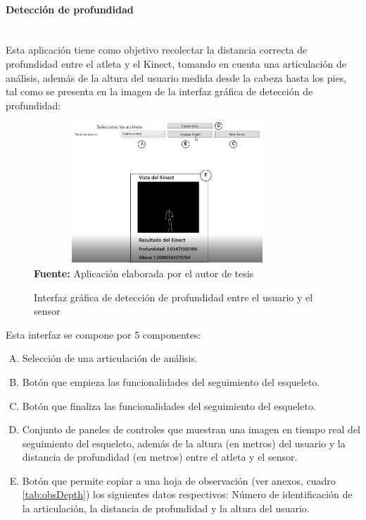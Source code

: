 \paragraph{Detecci\'on de profundidad}\mbox{} \\ \label{ins:UI:wpf:depth}
Esta aplicaci\'on tiene como objetivo recolectar la distancia correcta de profundidad entre el atleta y el Kinect, tomando en cuenta una articulaci\'on de an\'alisis, adem\'as de la altura del usuario medida desde la cabeza hasta los pies, tal como se presenta en la imagen de la interfaz gr\'afica de detecci\'on de profundidad:
\begin{figure}[H]
	\caption{Interfaz gr\'afica de detecci\'on de profundidad entre el usuario y el sensor}
	\label{fig:appDepth}
	\centering
	\includegraphics[width=380px,height=200px]{graphics/appProfundidad.png} \\
	\textbf{Fuente:} Aplicaci\'on elaborada por el autor de tesis
\end{figure}
Esta interfaz se compone por 5 componentes:
\begin{enumerate}[A.]
    \item Selecci\'on de una articulaci\'on de an\'alisis.
    \item Bot\'on que empieza las funcionalidades del seguimiento del esqueleto.
    \item Bot\'on que finaliza las funcionalidades del seguimiento del esqueleto.
    \item Conjunto de paneles de controles que muestran una imagen en tiempo real del seguimiento del esqueleto, adem\'as de la altura (en metros) del usuario y la distancia de profundidad (en metros) entre el atleta y el sensor.
        \item Bot\'on que permite copiar a una hoja de observaci\'on (ver anexos, cuadro \ref{tab:obsDepth}) los siguientes datos respectivos: N\'umero de identificaci\'on de la articulaci\'on, la distancia de profundidad y la altura del usuario.
\end{enumerate}
